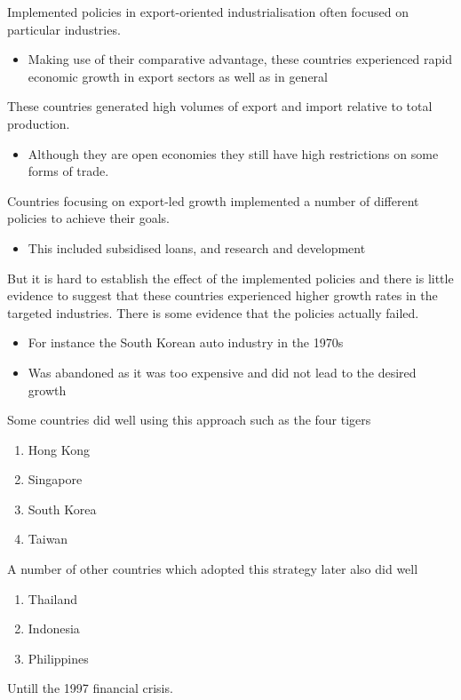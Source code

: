 \documentclass{beamer}
\begin{document}
\begin{frame}
 Implemented policies in export-oriented industrialisation often focused on particular industries.
 \begin{itemize}
   \item Making use of their comparative advantage, these countries experienced rapid economic growth in export sectors as well as in general   
  \end{itemize}
  \medskip 
 These countries generated high volumes of export and import relative to total production.
 \begin{itemize}
   \item Although they are open economies they still have high restrictions on some forms of trade.
 \end{itemize}
\end{frame}

\begin{frame}
 Countries focusing on export-led growth implemented a number of different policies to achieve their goals.
 \begin{itemize}
   \item This included subsidised loans, and research and development
 \end{itemize}
 \medskip
 But it is hard to establish the effect of the implemented policies and there is little evidence to suggest that these countries experienced higher growth rates in the targeted industries. 
 There is some evidence that the policies actually failed.
 \begin{itemize}
   \item For instance the South Korean auto industry in the 1970s
   \item Was abandoned as it was too expensive and did not lead to the desired growth
 \end{itemize}
\end{frame}

\begin{frame}
  Some countries did well using this approach such as the four tigers
  \begin{enumerate}
    \item Hong Kong
    \item Singapore
    \item South Korea
    \item Taiwan
  \end{enumerate}
  \medskip
  A number of other countries which adopted this strategy later also did well
  \begin{enumerate}
    \item Thailand
    \item Indonesia
    \item Philippines
  \end{enumerate}
  \medskip
  Untill the 1997 financial crisis.
\end{frame}
\end{document}
